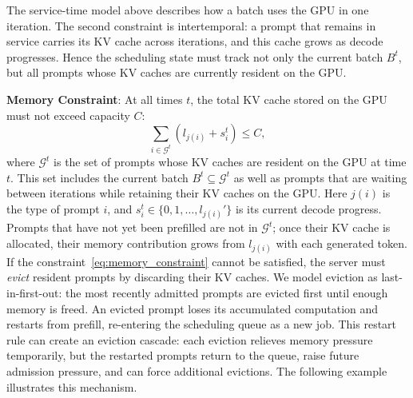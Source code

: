 The service-time model above describes how a batch uses the GPU in one iteration. The second constraint is intertemporal: a prompt that remains in service carries its KV cache across iterations, and this cache grows as decode progresses. Hence the scheduling state must track not only the current batch \(B^t\), but all prompts whose KV caches are currently resident on the GPU.

\textbf{Memory Constraint}: At all times \(t\), the total KV cache stored on the GPU must not exceed capacity \(C\):
\begin{equation}
\label{eq:memory_constraint}
\sum_{i \in \mathcal{G}^t} (l_{j(i)} + s^t_i) \le C,
\end{equation}
where \(\mathcal{G}^t\) is the set of prompts whose KV caches are resident on the GPU at time \(t\). This set includes the current batch \(B^t \subseteq \mathcal{G}^t\) as well as prompts that are waiting between iterations while retaining their KV caches on the GPU. Here \(j(i)\) is the type of prompt \(i\), and \(s_i^t \in \{0,1,\dots,l_{j(i)}'\}\) is its current decode progress. Prompts that have not yet been prefilled are not in \(\mathcal{G}^t\); once their KV cache is allocated, their memory contribution grows from \(l_{j(i)}\) with each generated token. If the constraint~\eqref{eq:memory_constraint} cannot be satisfied, the server must \textit{evict} resident prompts by discarding their KV caches. We model eviction as last-in-first-out: the most recently admitted prompts are evicted first until enough memory is freed. An evicted prompt loses its accumulated computation and restarts from prefill, re-entering the scheduling queue as a new job. This restart rule can create an eviction cascade: each eviction relieves memory pressure temporarily, but the restarted prompts return to the queue, raise future admission pressure, and can force additional evictions. The following example illustrates this mechanism.

